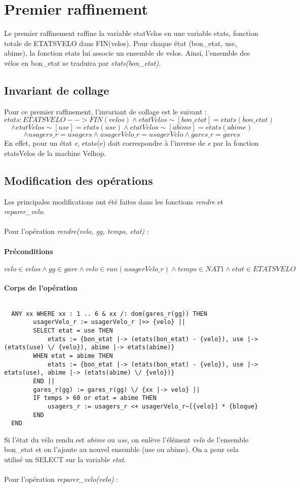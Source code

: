 \documentclass[12pt]{article}
\begin{document}
\section{Premier raffinement}
Le premier raffinement raffine la variable etatVelos en une variable etats, fonction totale de ETATSVELO dans FIN(velos). Pour chaque état (bon\_etat, use, abime), la fonction etats lui associe un ensemble de velos. Ainsi, l'ensemble des vélos en bon\_etat se traduira par \textit{etats(bon\_etat)}.
\subsection{Invariant de collage}
Pour ce premier raffinement, l'invariant de collage est le suivant : \\
\[ etats : ETATSVELO --> FIN(velos) \land etatVelos\sim[{bon\_etat}] = etats(bon\_etat) \]
\[ \land etatVelos\sim[{use}] = etats(use) \land etatVelos\sim[{abime}] = etats(abime) \]
\[ \land usagers\_r = usagers \land usagerVelo\_r = usagerVelo \land gares\_r = gares \]
En effet, pour un état \textit{e}, etats(e) doit correspondre à l'inverse de \textit{e} par la fonction etatsVelos de la machine Velhop.
\subsection{Modification des opérations}
Les principales modifications ont été faites dans les fonctions \textit{rendre} et \textit{reparer\_velo}. \\ \\
Pour l'opération \textit{rendre(velo, gg, temps, etat)} :
\paragraph{Préconditions}
\[ velo \in velos \land gg \in gare \land velo \in ran(usagerVelo\_r) \land temps \in NAT1 \land etat \in ETATSVELO\]
\paragraph{Corps de l'opération}
\[\]
\begin{lstlisting}
  ANY xx WHERE xx : 1 .. 6 & xx /: dom(gares_r(gg)) THEN
        usagerVelo_r := usagerVelo_r |>> {velo} ||
        SELECT etat = use THEN
            etats := {bon_etat |-> (etats(bon_etat) - {velo}), use |-> (etats(use) \/ {velo}), abime |-> etats(abime)}
        WHEN etat = abime THEN
            etats := {bon_etat |-> (etats(bon_etat) - {velo}), use |-> etats(use), abime |-> (etats(abime) \/ {velo})}
        END ||
        gares_r(gg) := gares_r(gg) \/ {xx |-> velo} ||
        IF temps > 60 or etat = abime THEN
            usagers_r := usagers_r <+ usagerVelo_r~[{velo}] * {bloque}
        END
  END
\end{lstlisting}
Si l'état du vélo rendu est \textit{abime} ou \textit{use}, on enlève l'élément \textit{velo} de l'ensemble bon\_etat et on l'ajoute au nouvel ensemble (use ou abime). On a pour cela utilisé un SELECT sur la variable \textit{etat}. \\ \\
Pour l'opération \textit{reparer\_velo(velo)} :
\end{document}
